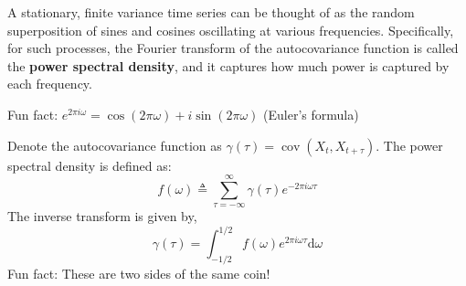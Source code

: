\documentclass[letterpaper,11pt]{exam}
\DeclareMathOperator*{\cov}{cov}
\begin{document}
\begin{questions}
\newpage

\question
A stationary, finite variance time series can be thought of as the random superposition of sines and cosines oscillating at various frequencies.
Specifically, for such processes, the Fourier transform of the autocovariance function is called the \textbf{power spectral density}, and it captures how much power is captured by each frequency.
\begin{tcolorbox}
    Fun fact: $e^{2\pi i \omega} = \cos(2\pi\omega) + i \sin(2\pi\omega)$
    (Euler's formula)
\end{tcolorbox}
\begin{tcolorbox}
    Denote the autocovariance function as $\gamma(\tau) = \cov(X_t, X_{t+\tau})$.
    The power spectral density is defined as:
    \begin{equation}\label{eq:psd:acov}
	f(\omega) \triangleq \sum_{\tau=-\infty}^{\infty} \gamma(\tau) e^{-2\pi i \omega \tau}
    \end{equation}
    The inverse transform is given by,
    \begin{equation}\label{eq:psd:acov:inv}
	\gamma(\tau) = \int_{-1/2}^{1/2} f(\omega) e^{2\pi i \omega \tau} \mathrm{d}\omega
    \end{equation}
    Fun fact: These are two sides of the same coin!
\end{tcolorbox}
\end{questions}
\end{document}
